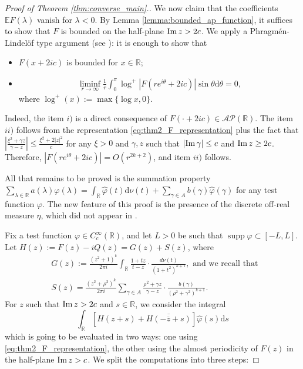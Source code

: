\documentclass[a4paper,reqno,12pt]{amsart}
\DeclareMathOperator{\supp}{\mathrm{supp}}
\newcommand{\A}{\mathcal{A}}
\renewcommand{\P}{\mathcal{P}}
\renewcommand{\r}{\mathbb{R}}
\newcommand{\ft}{\widehat}
\newcommand{\la}{\lambda}
\newcommand{\ga}{\gamma}
\newcommand{\p}{\varphi}
\renewcommand{\d}{\mathrm{d}}
\newcommand{\ov}[1]{\overline{#1}}
\newcommand{\cd}{\cdot}
\newcommand{\1}{{\bf 1}}
\newcommand{\ra}{\rightarrow}
\newcommand{\e}{\mathbb{E}}
\renewcommand{\Im}{{\rm Im}\,}
\begin{document}
\begin{proof}[Proof of Theorem \ref{thm:converse_main}.]
We now claim that the coefficients $\e F(\la)$ vanish for $\la<0$. By Lemma \ref{lemma:bounded_ap_function}, it suffices to show that $F$ is bounded on the half-plane $\Im{z}>2c$. We apply a Phragm\'{e}n-Lindel\"{o}f type argument (see \cite[Theorem 1]{dB}): it is enough to show that
\begin{itemize}
    \item[i)] $F(x+2ic)$ is bounded for $x\in\r$;
    \item[ii)] \begin{align*}
        \liminf_{r\ra\infty} \frac{1}{r} \int_{0}^{\pi} \log^+|F(re^{i\theta}+2ic)|\sin{\theta}\d\theta=0,
    \end{align*}
    where $\log^+(x):=\max\{\log{x},0\}$.
\end{itemize}
Indeed, the item $i)$ is a direct consequence of $F(\cd+2ic)\in\A\P(\r)$. The item $ii)$ follows from the representation \eqref{eq:thm2_F_representation} plus the fact that $\left|\frac{\xi^2+\ga z}{\ga-z}\right|\leq\frac{\xi^2+2|z|^2}{c}$ for any $\xi>0$ and $\ga,z$ such that $|\Im{\ga}|\leq c$ and $\Im{z}\geq2c$. Therefore, $|F(re^{i\theta}+2ic)|=O(r^{2k+2})$, and item $ii)$ follows.

All that remains to be proved is the summation property $\sum_{\la\in\r} a(\la)\p(\la)=\int_{\r} \ft{\p}(t)\d\nu(t)+\sum_{\ga\in A} b(\ga)\ft{\p}(\ga)$ for any test function $\p$. The new feature of this proof is the presence of the discrete off-real measure $\eta$, which did not appear in \cite[Theorem 2]{GV}.

Fix a test function $\p\in C^\infty_c(\r)$, and let $L>0$ be such that $\supp{\p}\subset [-L,L]$. Let $H(z):=F(z)-iQ(z)=G(z)+S(z)$, where
\begin{align*}
    &G(z):=\frac{(z^2+1)^k}{2\pi i} \int_{\r} \frac{1+tz}{t-z}\cd\frac{d\nu(t)}{(1+t^2)^{k+1}}, \text{ and we recall that }\\
    &S(z)=\frac{(z^2+\rho^2)^k}{2\pi i} \sum_{\ga\in A} \frac{\rho^2+\ga z}{\ga-z}\cd\frac{b(\ga)}{(\rho^2+\ga^2)^{k+1}}.
\end{align*}
For $z$ such that $\Im{z}>2c$ and $s\in\r$, we consider the integral
\begin{equation}
\label{eq:H_indentity}
    \int_{\r} \left[H(z+s)+\ov{H(-\ov{z}+s)}\right]\ft{\p}(s)\d s
\end{equation}
which is going to be evaluated in two ways: one using \eqref{eq:thm2_F_representation}, the other using the almost periodicity of $F(z)$ in the half-plane $\Im{z}>c$. We split the computations into three steps:

\end{proof}
\end{document}
